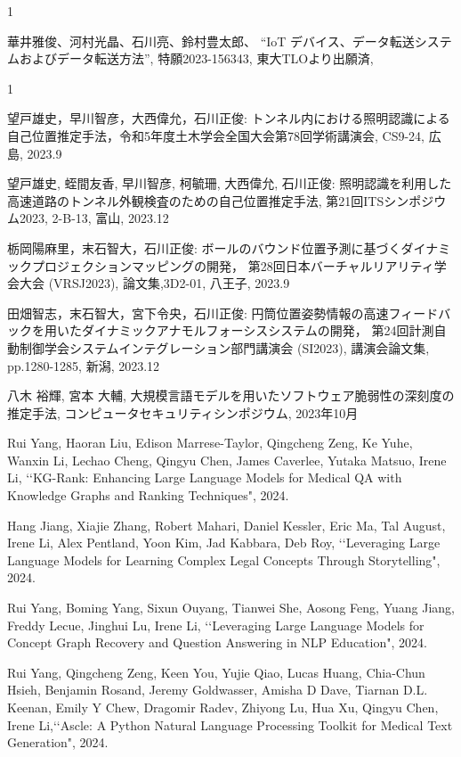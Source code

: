 \begin{特許}{1}


華井雅俊、河村光晶、石川亮、鈴村豊太郎、
“IoT デバイス、データ転送システムおよびデータ転送方法”,
特願2023-156343,
東大TLOより出願済,
\end{特許}

\begin{発表}{1}


望戸雄史，早川智彦，大西偉允，石川正俊:  トンネル内における照明認識による自己位置推定手法，令和5年度土木学会全国大会第78回学術講演会, CS9-24, 広島, 2023.9

望戸雄史, 蛭間友香, 早川智彦, 柯毓珊, 大西偉允, 石川正俊:  照明認識を利用した高速道路のトンネル外観検査のための自己位置推定手法, 第21回ITSシンポジウム2023, 2-B-13, 富山, 2023.12

栃岡陽麻里，末石智大，石川正俊: ボールのバウンド位置予測に基づくダイナミックプロジェクションマッピングの開発， 第28回日本バーチャルリアリティ学会大会 (VRSJ2023), 論文集,3D2-01, 八王子, 2023.9

田畑智志，末石智大，宮下令央，石川正俊: 円筒位置姿勢情報の高速フィードバックを用いたダイナミックアナモルフォーシスシステムの開発， 第24回計測自動制御学会システムインテグレーション部門講演会 (SI2023), 講演会論文集, pp.1280-1285, 新潟, 2023.12


八木 裕輝, 宮本 大輔, 大規模言語モデルを用いたソフトウェア脆弱性の深刻度の推定手法, コンピュータセキュリティシンポジウム, 2023年10月


Rui Yang, Haoran Liu, Edison Marrese-Taylor, Qingcheng Zeng, Ke Yuhe, Wanxin Li, Lechao Cheng, Qingyu Chen, James Caverlee, Yutaka Matsuo, Irene Li, \lq\lq KG-Rank: Enhancing Large Language Models for Medical QA with Knowledge Graphs and Ranking Techniques", 2024.

Hang Jiang, Xiajie Zhang, Robert Mahari, Daniel Kessler, Eric Ma, Tal August, Irene Li, Alex Pentland, Yoon Kim, Jad Kabbara, Deb Roy, \lq\lq Leveraging Large Language Models for Learning Complex Legal Concepts Through Storytelling", 2024.

Rui Yang, Boming Yang, Sixun Ouyang, Tianwei She, Aosong Feng, Yuang Jiang, Freddy Lecue, Jinghui Lu, Irene Li, \lq\lq Leveraging Large Language Models for Concept Graph Recovery and Question Answering in NLP Education", 2024.

Rui Yang, Qingcheng Zeng, Keen You, Yujie Qiao, Lucas Huang, Chia-Chun Hsieh, Benjamin Rosand, Jeremy Goldwasser, Amisha D Dave, Tiarnan D.L. Keenan, Emily Y Chew, Dragomir Radev, Zhiyong Lu, Hua Xu, Qingyu Chen, Irene Li,\lq\lq Ascle: A Python Natural Language Processing Toolkit for Medical Text Generation", 2024.


\end{発表}

